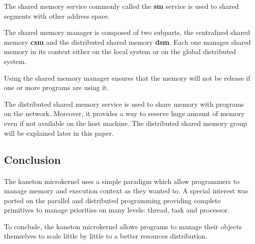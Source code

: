 \begin{multicols}{2}
The shared memory service commonly called the \textbf{sm} service is used
to shared segments with other address space.

The shared memory manager is composed of two subparts, the centralized
shared memory \textbf{csm} and the distributed shared memory \textbf{dsm}.
Each one manages shared memory in its context either on the local system
or on the global distributed system.

Using the shared memory manager ensures that the memory will not be release
if one or more programs are using it.

The distributed shared memory service is used to share memory with
programs on the network. Moreover, it provides a way to reserve huge amount
of memory even if not available on the host machine. The distributed shared
memory group will be explained later in this paper.

\subsection{Conclusion}

\paragraph{}

The kaneton microkernel uses a simple paradigm which allow programmers to
manage memory and execution context as they wanted to. A special interest
was ported on the parallel and distributed programming providing complete
primitives to manage priorities on many levels: thread, task and processor.

To conclude, the kaneton microkernel allows programs to manage their objects
themselves to scale little by little to a better resources distribution.

\end{multicols}



